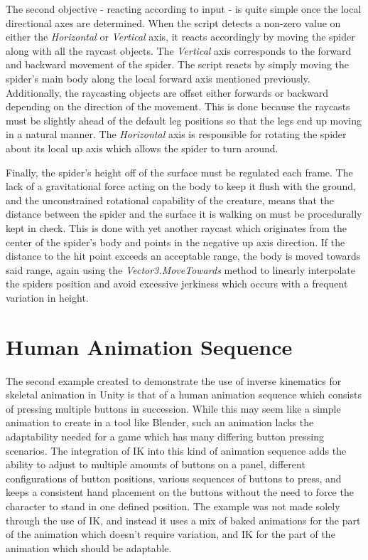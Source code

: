 The second objective - reacting according to input - is quite simple once the
local directional axes are determined. When the script detects a non-zero value
on either the \textit{Horizontal} or \textit{Vertical} axis, it reacts
accordingly by moving the spider along with all the raycast objects. The
\textit{Vertical} axis corresponds to the forward and backward movement of the
spider. The script reacts by simply moving the spider's main body along the
local forward axis mentioned previously. Additionally, the raycasting objects
are offset either forwards or backward depending on the direction of the
movement. This is done because the raycasts must be slightly ahead of the
default leg positions so that the legs end up moving in a natural manner.
The \textit{Horizontal} axis is responsible for rotating the spider about its
local up axis which allows the spider to turn around. 

Finally, the spider's height off of the surface must be regulated each frame.
The lack of a gravitational force acting on the body to keep it flush with the
ground, and the unconstrained rotational capability of the creature, means that
the distance between the spider and the surface it is walking on must be
procedurally kept in check. This is done with yet another raycast which
originates from the center of the spider's body and points in the negative up
axis direction. If the distance to the hit point exceeds an acceptable range,
the body is moved towards said range, again using the
\textit{Vector3.MoveTowards} method to linearly interpolate the spiders position
and avoid excessive jerkiness which occurs with a frequent variation in height. 



\section{Human Animation Sequence}
The second example created to demonstrate the use of inverse kinematics for
skeletal animation in Unity is that of a human animation sequence which consists
of pressing multiple buttons in succession. While this may seem like a simple
animation to create in a tool like Blender, such an animation lacks the
adaptability needed for a game which has many differing button pressing
scenarios. The integration of IK into this kind of animation sequence adds the
ability to adjust to multiple amounts of buttons on a panel, different
configurations of button positions, various sequences of buttons to press, and
keeps a consistent hand placement on the buttons without the need to force the
character to stand in one defined position. The example was not made solely
through the use of IK, and instead it uses a mix of baked animations for the
part of the animation which doesn't require variation, and IK for the part of
the animation which should be adaptable.

